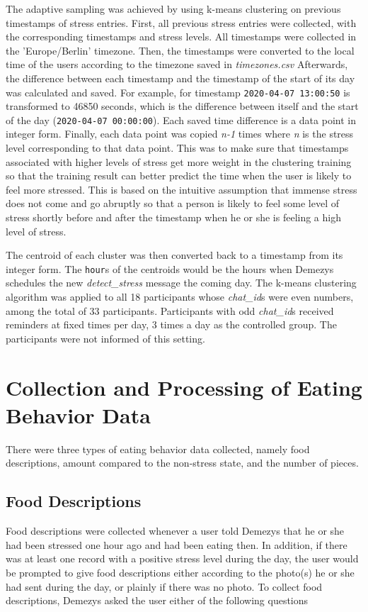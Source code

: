 The adaptive sampling was achieved by using k-means clustering on previous timestamps of stress entries. First, all previous stress entries were collected, with the corresponding timestamps and stress levels. All timestamps were collected in the 'Europe/Berlin' timezone. Then, the timestamps were converted to the local time of the users according to the timezone saved in \emph{timezones.csv} Afterwards, the difference between each timestamp and the timestamp of the start of its day was calculated and saved. For example, for timestamp \texttt{2020-04-07 13:00:50} is transformed to 46850 seconds, which is the difference between itself and the start of the day (\texttt{2020-04-07 00:00:00}). Each saved time difference is a data point in integer form. Finally, each data point was copied \emph{n-1} times where \emph{n} is the stress level corresponding to that data point. This was to make sure that timestamps associated with higher levels of stress get more weight in the clustering training so that the training result can better predict the time when the user is likely to feel more stressed. This is based on the intuitive assumption that immense stress does not come and go abruptly so that a person is likely to feel some level of stress shortly before and after the timestamp when he or she is feeling a high level of stress.

The centroid of each cluster was then converted back to a timestamp from its integer form. The \texttt{hour}s of the centroids would be the hours when Demezys schedules the new \emph{detect\_stress} message the coming day. The k-means clustering algorithm was applied to all 18 participants whose \emph{chat\_id}s were even numbers, among the total of 33 participants. Participants with odd \emph{chat\_id}s received reminders at fixed times per day, 3 times a day as the controlled group. The participants were not informed of this setting.

\section{Collection and Processing of Eating Behavior Data}
There were three types of eating behavior data collected, namely food descriptions, amount compared to the non-stress state, and the number of pieces.

\subsection{Food Descriptions}
Food descriptions were collected whenever a user told Demezys that he or she had been stressed one hour ago and had been eating then. In addition, if there was at least one record with a positive stress level during the day, the user would be prompted to give food descriptions either according to the photo(s) he or she had sent during the day, or plainly if there was no photo. To collect food descriptions, Demezys asked the user either of the following questions

